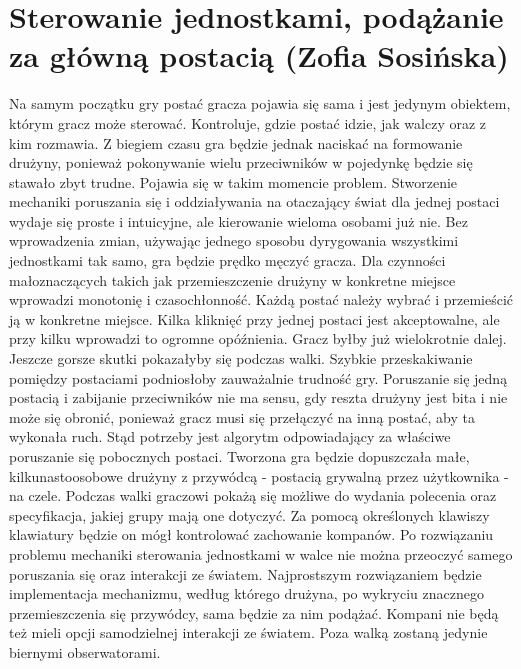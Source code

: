 \section{Sterowanie jednostkami, podążanie za główną postacią (Zofia Sosińska)}\label{chap:sjpzgp}
Na samym początku gry postać gracza pojawia się sama i jest jedynym obiektem, którym gracz może sterować.
Kontroluje, gdzie postać idzie, jak walczy oraz z kim rozmawia. Z biegiem czasu gra będzie jednak naciskać na formowanie drużyny,
ponieważ pokonywanie wielu przeciwników w pojedynkę będzie się stawało zbyt trudne. Pojawia się w takim momencie problem.
Stworzenie mechaniki poruszania się i oddziaływania na otaczający świat dla jednej postaci wydaje się proste i intuicyjne, ale kierowanie wieloma osobami już nie. 
Bez wprowadzenia zmian, używając jednego sposobu dyrygowania wszystkimi jednostkami tak samo, gra będzie prędko męczyć gracza.
Dla czynności małoznaczących takich jak przemieszczenie drużyny w konkretne miejsce wprowadzi monotonię i czasochłonność.
Każdą postać należy wybrać i przemieścić ją w konkretne miejsce. Kilka kliknięć przy jednej postaci jest akceptowalne, ale przy kilku wprowadzi to ogromne opóźnienia.
Gracz byłby już wielokrotnie dalej. Jeszcze gorsze skutki pokazałyby się podczas walki. Szybkie przeskakiwanie pomiędzy postaciami podniosłoby zauważalnie trudność gry.
Poruszanie się jedną postacią i zabijanie przeciwników nie ma sensu, gdy reszta drużyny jest bita i nie może się obronić, ponieważ gracz musi się przełączyć na inną postać,
aby ta wykonała ruch. Stąd potrzeby jest algorytm odpowiadający za właściwe poruszanie się pobocznych postaci.
Tworzona gra będzie dopuszczała małe, kilkunastoosobowe drużyny z przywódcą - postacią grywalną przez użytkownika - na czele.
Podczas walki graczowi pokażą się możliwe do wydania polecenia oraz specyfikacja, jakiej grupy mają one dotyczyć.
Za pomocą określonych klawiszy klawiatury będzie on mógł kontrolować zachowanie kompanów.
Po rozwiązaniu problemu mechaniki sterowania jednostkami w walce nie można przeoczyć samego poruszania się oraz interakcji ze światem.
Najprostszym rozwiązaniem będzie implementacja mechanizmu, według którego drużyna, po wykryciu znacznego przemieszczenia się przywódcy, sama będzie za nim podążać.
Kompani nie będą też mieli opcji samodzielnej interakcji ze światem. Poza walką zostaną jedynie biernymi obserwatorami.
